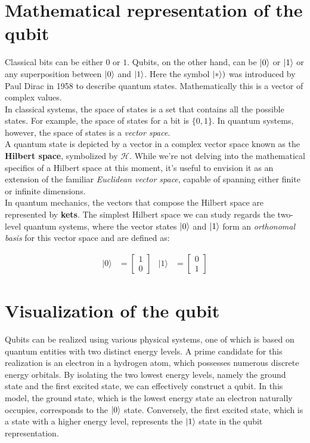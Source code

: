 \documentclass[12pt,a4paper]{report}
\begin{document}
\section{Mathematical representation of the qubit}
Classical bits can be either \(0\) or \(1\). Qubits, on the other hand, can be \(\ket{0}\) or \(\ket{1}\) or any superposition between \(\ket{0}\) and \(\ket{1}\). Here the symbol \(\ket{*})\) was introduced by Paul Dirac in 1958 to describe quantum states. Mathematically this is a vector of complex values.
\\

\noindent
In classical systems, the space of states is a set that contains all the possible states. For example, the space of states for a bit is $\{0,1\}$. In quantum systems, however, the space of states is a \emph{vector space}. 
\\

\noindent
A quantum state is depicted by a vector in a complex vector space known as the \textbf{Hilbert space}, symbolized by $\mathcal{H}$. While we're not delving into the mathematical specifics of a Hilbert space at this moment, it's useful to envision it as an extension of the familiar \emph{Euclidean vector space}, capable of spanning either finite or infinite dimensions.
\\

\noindent
In quantum mechanics, the vectors that compose the Hilbert space are represented by \textbf{kets}. The simplest Hilbert space we can study regards the two-level quantum systems, where the vector states $\ket{0}$ and $\ket{1}$ form an \emph{orthonomal basis} for this vector space and are defined as:

\begin{align*}
|0\rangle &= \begin{bmatrix} 1 \\ 0 \end{bmatrix} &
|1\rangle &= \begin{bmatrix} 0 \\ 1 \end{bmatrix}
\end{align*}


\newpage

\section{Visualization of the qubit}
\noindent
Qubits can be realized using various physical systems, one of which is based on quantum entities with two distinct energy levels. A prime candidate for this realization is an electron in a hydrogen atom, which possesses numerous discrete energy orbitals. By isolating the two lowest energy levels, namely the ground state and the first excited state, we can effectively construct a qubit. In this model, the ground state, which is the lowest energy state an electron naturally occupies, corresponds to the $\ket{0}$ state. Conversely, the first excited state, which is a state with a higher energy level, represents the $\ket{1}$ state in the qubit representation.
\\
\end{document}
